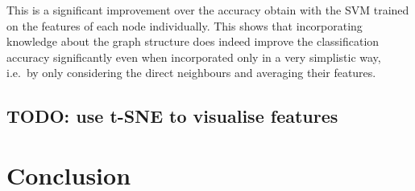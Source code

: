 \documentclass[12pt]{article}
\theoremstyle{definition}
\begin{document}
This is a significant improvement over the accuracy obtain with the SVM trained on the features of each node individually. This shows that incorporating knowledge about the graph structure does indeed improve the classification accuracy significantly even when incorporated only in a very simplistic way, i.e.\ by only considering the direct neighbours and averaging their features.

\subsection{TODO: use t-SNE to visualise features}

\section{Conclusion}



\end{document}
